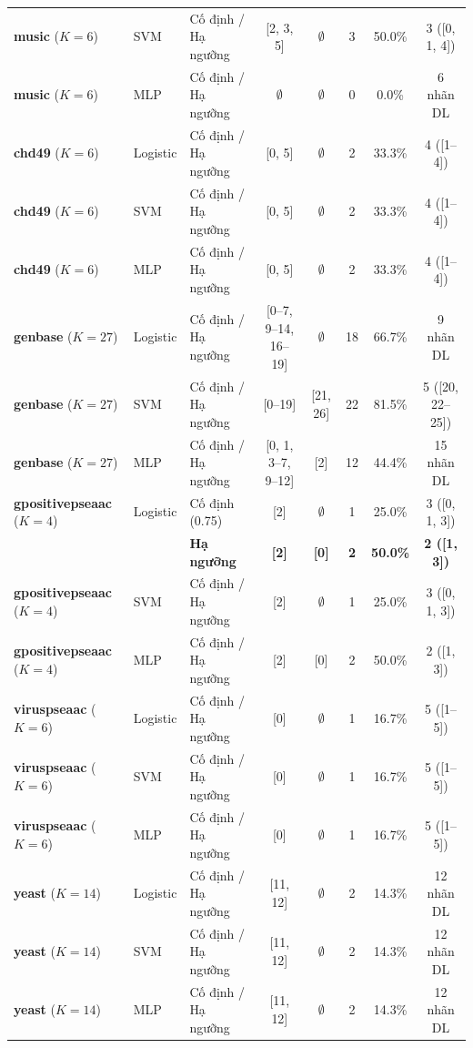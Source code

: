 \documentclass[10pt,a4paper,twoside]{article}
\begin{document}
\begin{table}[H]
{\begin{tabular}{lllccccc}
\textbf{music} ($K=6$) & SVM & Cố định / Hạ ngưỡng & [2, 3, 5] & $\emptyset$ & 3 & 50.0\% & 3 ([0, 1, 4]) \\
\textbf{music} ($K=6$) & MLP & Cố định / Hạ ngưỡng & $\emptyset$ & $\emptyset$ & 0 & 0.0\% & 6 nhãn DL \\
\midrule
\textbf{chd49} ($K=6$) & Logistic & Cố định / Hạ ngưỡng & [0, 5] & $\emptyset$ & 2 & 33.3\% & 4 ([1--4]) \\
\textbf{chd49} ($K=6$) & SVM & Cố định / Hạ ngưỡng & [0, 5] & $\emptyset$ & 2 & 33.3\% & 4 ([1--4]) \\
\textbf{chd49} ($K=6$) & MLP & Cố định / Hạ ngưỡng & [0, 5] & $\emptyset$ & 2 & 33.3\% & 4 ([1--4]) \\
\midrule
\textbf{genbase} ($K=27$) & Logistic & Cố định / Hạ ngưỡng & [0--7, 9--14, 16--19] & $\emptyset$ & 18 & 66.7\% & 9 nhãn DL \\
\textbf{genbase} ($K=27$) & SVM & Cố định / Hạ ngưỡng & [0--19] & [21, 26] & 22 & 81.5\% & 5 ([20, 22--25]) \\
\textbf{genbase} ($K=27$) & MLP & Cố định / Hạ ngưỡng & [0, 1, 3--7, 9--12] & [2] & 12 & 44.4\% & 15 nhãn DL \\
\midrule
\textbf{gpositivepseaac} ($K=4$) & Logistic & Cố định (0.75) & [2] & $\emptyset$ & 1 & 25.0\% & 3 ([0, 1, 3]) \\
 & & \textbf{Hạ ngưỡng} & \textbf{[2]} & \textbf{[0]} & \textbf{2} & \textbf{50.0\%} & \textbf{2 ([1, 3])} \\
\textbf{gpositivepseaac} ($K=4$) & SVM & Cố định / Hạ ngưỡng & [2] & $\emptyset$ & 1 & 25.0\% & 3 ([0, 1, 3]) \\
\textbf{gpositivepseaac} ($K=4$) & MLP & Cố định / Hạ ngưỡng & [2] & [0] & 2 & 50.0\% & 2 ([1, 3]) \\
\midrule
\textbf{viruspseaac} ($K=6$) & Logistic & Cố định / Hạ ngưỡng & [0] & $\emptyset$ & 1 & 16.7\% & 5 ([1--5]) \\
\textbf{viruspseaac} ($K=6$) & SVM & Cố định / Hạ ngưỡng & [0] & $\emptyset$ & 1 & 16.7\% & 5 ([1--5]) \\
\textbf{viruspseaac} ($K=6$) & MLP & Cố định / Hạ ngưỡng & [0] & $\emptyset$ & 1 & 16.7\% & 5 ([1--5]) \\
\midrule
\textbf{yeast} ($K=14$) & Logistic & Cố định / Hạ ngưỡng & [11, 12] & $\emptyset$ & 2 & 14.3\% & 12 nhãn DL \\
\textbf{yeast} ($K=14$) & SVM & Cố định / Hạ ngưỡng & [11, 12] & $\emptyset$ & 2 & 14.3\% & 12 nhãn DL \\
\textbf{yeast} ($K=14$) & MLP & Cố định / Hạ ngưỡng & [11, 12] & $\emptyset$ & 2 & 14.3\% & 12 nhãn DL \\

\end{tabular}}
\end{table}
\end{document}
